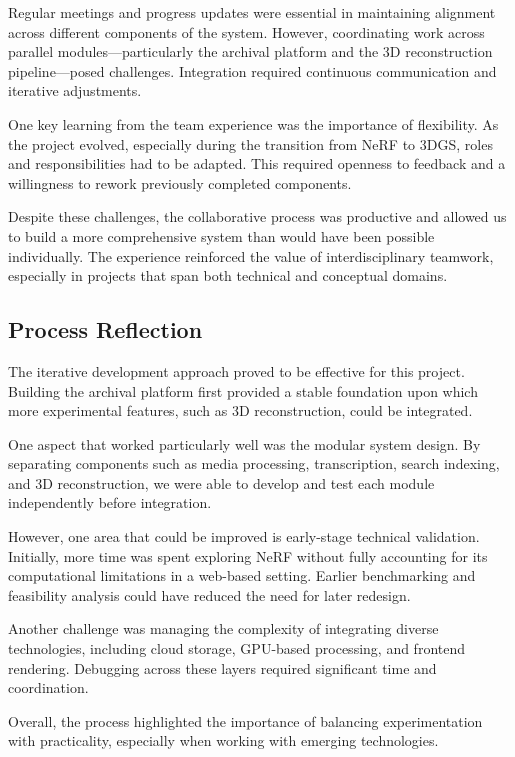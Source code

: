 Regular meetings and progress updates were essential in maintaining alignment across different components of the system. However, coordinating work across parallel modules—particularly the archival platform and the 3D reconstruction pipeline—posed challenges. Integration required continuous communication and iterative adjustments.

One key learning from the team experience was the importance of flexibility. As the project evolved, especially during the transition from NeRF to 3DGS, roles and responsibilities had to be adapted. This required openness to feedback and a willingness to rework previously completed components.

Despite these challenges, the collaborative process was productive and allowed us to build a more comprehensive system than would have been possible individually. The experience reinforced the value of interdisciplinary teamwork, especially in projects that span both technical and conceptual domains.

\subsection{Process Reflection}

The iterative development approach proved to be effective for this project. Building the archival platform first provided a stable foundation upon which more experimental features, such as 3D reconstruction, could be integrated.

One aspect that worked particularly well was the modular system design. By separating components such as media processing, transcription, search indexing, and 3D reconstruction, we were able to develop and test each module independently before integration.

However, one area that could be improved is early-stage technical validation. Initially, more time was spent exploring NeRF without fully accounting for its computational limitations in a web-based setting. Earlier benchmarking and feasibility analysis could have reduced the need for later redesign.

Another challenge was managing the complexity of integrating diverse technologies, including cloud storage, GPU-based processing, and frontend rendering. Debugging across these layers required significant time and coordination.

Overall, the process highlighted the importance of balancing experimentation with practicality, especially when working with emerging technologies.

